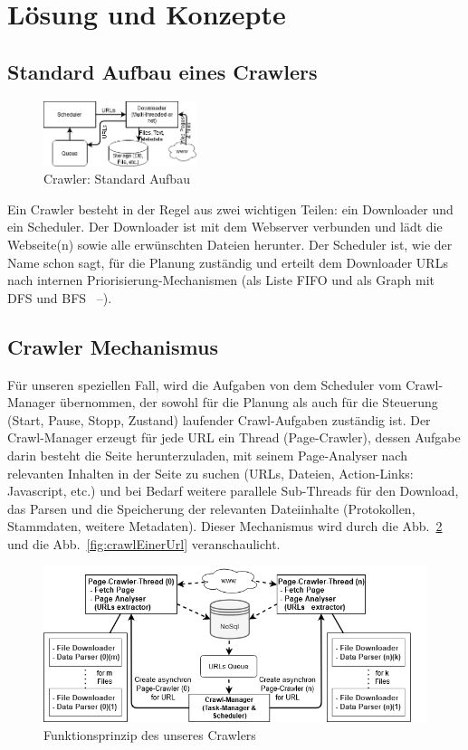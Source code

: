\section{Lösung und Konzepte}\label{sec:02_03_loesung_konzept}
\subsection{Standard Aufbau eines Crawlers}
\begin{figure}
  \centering
    \includegraphics[width=0.4\textwidth]{images/02-Crawler/Crawler-Standard-Crawler.png}
  \caption{\label{fig:standardCrawler}Crawler: Standard Aufbau}
\end{figure}
Ein Crawler besteht in der Regel aus zwei wichtigen Teilen: ein Downloader und ein Scheduler. Der Downloader ist mit dem Webserver verbunden und lädt die Webseite(n) sowie alle erwünschten Dateien herunter. Der Scheduler ist, wie der Name schon sagt, für die Planung zuständig und erteilt dem Downloader URLs nach internen Priorisierung-Mechanismen (als Liste FIFO und als Graph mit DFS und BFS ~\cite{ThomasAlgorithms2009}--\cite{DonaldKnuth1998}). 
\subsection{Crawler Mechanismus}
Für unseren speziellen Fall, wird die Aufgaben von dem Scheduler vom Crawl-Manager übernommen, der sowohl für die Planung als auch für die Steuerung (Start, Pause, Stopp, Zustand) laufender Crawl-Aufgaben zuständig ist. Der Crawl-Manager erzeugt für jede URL ein Thread (Page-Crawler), dessen Aufgabe darin besteht die Seite herunterzuladen, mit seinem Page-Analyser nach relevanten Inhalten in der Seite zu suchen (URLs, Dateien, Action-Links: Javascript, etc.) und bei Bedarf weitere parallele Sub-Threads für den Download, das Parsen und die Speicherung der relevanten Dateiinhalte (Protokollen, Stammdaten, weitere Metadaten). Dieser Mechanismus wird durch die Abb.~\ref{fig:funktionsprinzipCrawler} und die Abb.~\ref{fig:crawlEinerUrl} veranschaulicht.

\begin{figure}[H]
    \centering
    \includegraphics[width=5in]{images/02-Crawler/Crawler-Process-Diagram (Multithreading).png}
    \caption{Funktionsprinzip des unseres Crawlers}
    \label{fig:funktionsprinzipCrawler}
\end{figure}

